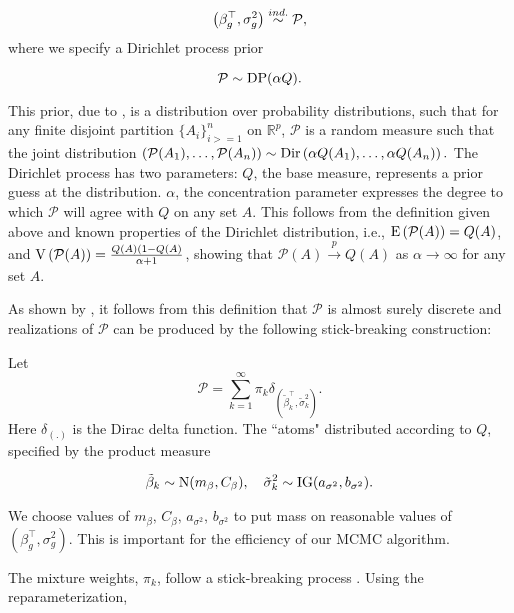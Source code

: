 \begin{equation}
\left(\beta_g^\top,\sigma^2_g\right) \stackrel{ind.}{\sim} \mathcal{P},
\end{equation}
where we specify a Dirichlet process prior

\begin{equation}
\mathcal{P} \sim \operatorname{DP}(\alpha Q).
\end{equation}

This prior, due to \citet{ferguson}, is a distribution over probability distributions, such that for any finite disjoint partition $\{A_i\}_{i>=1}^n$ on $\mathbb{R}^p$, $\mathcal{P}$ is a random measure such that the joint distribution $\left(\mathcal{P}(A_1),\ldots,\mathcal{P}(A_n)\right) \sim \operatorname{Dir}\left(\alpha Q(A_1),\ldots,\alpha Q(A_n)\right).$ The Dirichlet process has two parameters: $Q$, the base measure, represents a prior guess at the distribution. $\alpha$, the concentration parameter expresses the degree to which $\mathcal{P}$ will agree with $Q$ on any set $A$. This follows from the definition given above and known properties of the Dirichlet distribution, i.e., $\operatorname{E}\left(\mathcal{P}(A)\right)=Q(A)$, and $\operatorname{V}\left(\mathcal{P}(A)\right)=\frac{Q(A)(1 - Q(A)}{\alpha + 1}$, showing that $\mathcal{P}(A) \stackrel{p}{\rightarrow} Q(A)$ as $\alpha \rightarrow \infty$ for any set $A$. 

As shown by \citet{sethuraman}, it follows from this definition that $\mathcal{P}$ is almost surely discrete and realizations of $\mathcal{P}$ can be produced by the following stick-breaking construction:

Let 
\begin{equation}
\mathcal{P} =\sum_{k=1}^\infty \pi_k \delta_{\left(\tilde{\beta}_k^\top ,\tilde{\sigma}^2_k\right)}.
\end{equation}
Here $\delta_{(.)}$ is the Dirac delta function. The ``atoms" distributed according to $Q$, specified by the product measure

\begin{equation}
\tilde{\beta}_k \sim \operatorname{N}(m_\beta, C_\beta),\quad \tilde{\sigma}^2_k \sim \operatorname{IG}(a_{\sigma^2}, b_{\sigma^2}).
\end{equation}

We choose values of $m_\beta,\,C_\beta,\,a_{\sigma^2},\,b_{\sigma^2}$ to put mass on reasonable values of $\left(\beta_g^\top,\sigma^2_g\right)$. This is important for the efficiency of our MCMC algorithm.

The mixture weights, $\pi_k$,  follow a stick-breaking process \cite{sethuraman}. Using the reparameterization,

